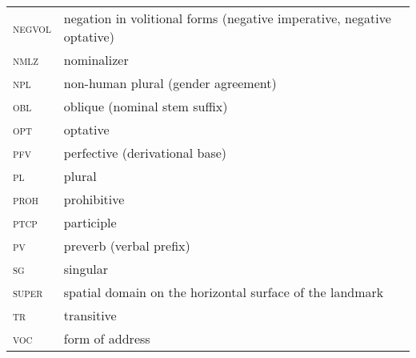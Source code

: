\documentclass[output=paper]{langsci/langscibook}
\begin{document}
\begin{longtable}[l]{@{}ll@{}}
\textsc{negvol}	& negation in volitional forms (negative imperative, negative optative) \\
\textsc{nmlz}	& nominalizer \\
\textsc{npl}	& non-human plural (gender agreement) \\
\textsc{obl}	& oblique (nominal stem suffix) \\
\textsc{opt}	& optative \\
\textsc{pfv}	& perfective (derivational base) \\
\textsc{pl}	& plural \\
\textsc{proh}	& prohibitive \\
\textsc{ptcp}	& participle \\
\textsc{pv}	& preverb (verbal prefix) \\
\textsc{sg}	& singular \\
\textsc{super}	& spatial domain on the horizontal surface of the landmark \\
\textsc{tr}	& transitive \\
\textsc{voc}	& form of address \\
\end{longtable}


\printbibliography[heading=subbibliography,notkeyword=this]

\clearpage





\end{document}
